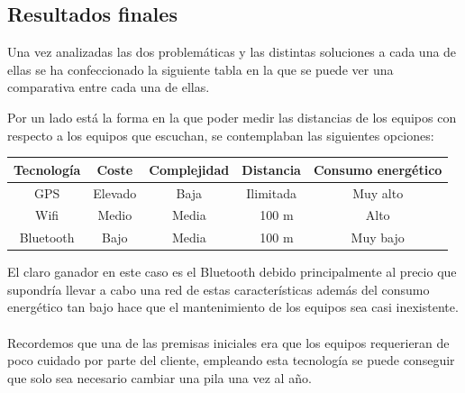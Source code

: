 \documentclass[a4paper ,12pt, onecolumn]{article}
\begin{document}
    \subsection{Resultados finales}
        Una vez analizadas las dos problemáticas y las distintas soluciones a cada una de ellas se ha confeccionado la siguiente tabla 
        en la que se puede ver una comparativa entre cada una de ellas.

        Por un lado está la forma en la que poder medir las distancias de los equipos con respecto a los equipos que escuchan,
        se contemplaban las siguientes opciones:
        \begin{center}
            \begin{tabular}{|c | c| c| c| c |} 
            \hline
            Tecnología  & Coste  & Complejidad & Distancia & Consumo energético \\ [0.5ex] 
            \hline
            GPS& Elevado& Baja & Ilimitada& Muy alto\\
            Wifi& Medio& Media & ~ 100 m & Alto\\ 
            Bluetooth& Bajo& Media & ~ 100 m & Muy bajo\\ 
            \hline
            \end{tabular}
        \end{center}   
        El claro ganador en este caso es el Bluetooth debido principalmente al precio que supondría llevar a cabo una red de estas 
        características además del consumo energético tan bajo hace que el mantenimiento de los equipos sea casi inexistente.
        \paragraph{}
        Recordemos que una de las premisas iniciales era que los equipos requerieran de poco cuidado por parte del cliente, empleando
        esta tecnología se puede conseguir que solo sea necesario cambiar una pila una vez al año.
\end{document}
